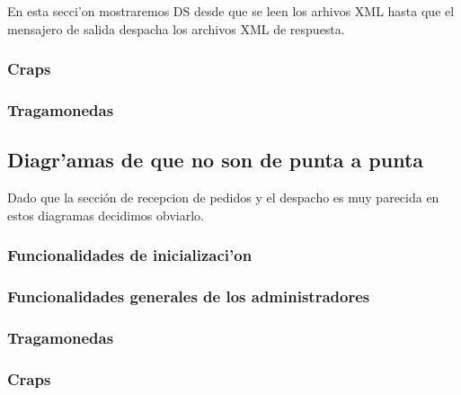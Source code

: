 En esta secci'on mostraremos DS desde que se leen los arhivos XML hasta que el mensajero de salida despacha los archivos XML de respuesta.

\subsubsection{Craps}


\subsubsection{Tragamonedas}



\subsection{Diagr'amas de que no son de punta a punta}
Dado que la sección de recepcion de pedidos y el despacho es muy parecida en estos diagramas decidimos obviarlo.

\subsubsection{Funcionalidades de inicializaci'on}


\subsubsection{Funcionalidades generales de los administradores}


\subsubsection{Tragamonedas}



\subsubsection{Craps}




